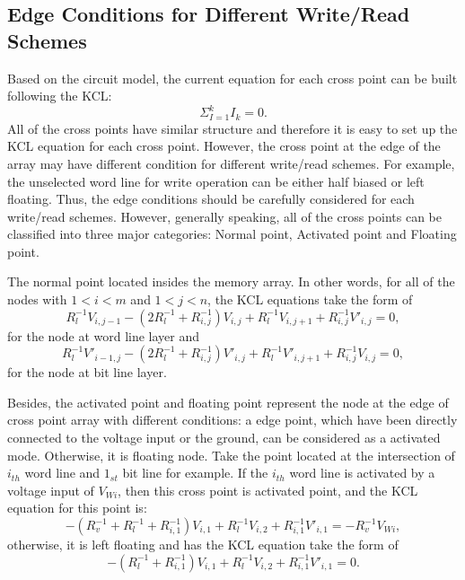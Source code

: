 \subsection{Edge Conditions for Different Write/Read Schemes}
Based on the circuit model, the current equation for each cross point can be built following the KCL:
\begin{equation}
  {\Sigma}_{I=1}^kI_k=0.
\end{equation}
All of the cross points have similar structure and therefore it is easy to set up the KCL equation for each cross point. However, the cross point at the edge of the array may have different condition for different write/read schemes. For example, the unselected word line for write operation can be either half biased or left floating. Thus, the edge conditions should be carefully considered for each write/read schemes. However, generally speaking, all of the cross points can be classified into three major categories: Normal point, Activated point and Floating point.

The normal point located insides the memory array. In other words, for all of the nodes with $1<i<m$ and $1<j<n$, the KCL equations take the form of
\begin{equation}\label{equ:KCL1}
R_l^{-1}V_{i,j-1} -(2R_l^{-1}+R_{i,j}^{-1})V_{i,j}+ R_l^{-1}V_{i,j+1}+R_{i,j}^{-1}V'_{i,j}=0,
\end{equation}
for the node at word line layer and
\begin{equation}\label{equ:KCL2}
R_l^{-1}V'_{i-1,j} -(2R_l^{-1}+R_{i,j}^{-1})V'_{i,j}+ R_l^{-1}V'_{i,j+1}+R_{i,j}^{-1}V_{i,j}=0,
\end{equation}
for the node at bit line layer.

Besides, the activated point and floating point represent the node at the edge of cross point array with different conditions: a edge point, which have been directly connected to the voltage input or the ground, can be considered as a activated mode. Otherwise, it is floating node. Take the point located at the intersection of $i_{th}$ word line and $1_{st}$ bit line for example. If the $i_{th}$ word line is activated by a voltage input of $V_{Wi}$, then this cross point is activated point, and the KCL equation for this point is:
\begin{equation}\label{equ:KCL3}
-(R_v^{-1}+R_l^{-1}+R_{i,1}^{-1})V_{i,1}+ R_l^{-1}V_{i,2}+R_{i,1}^{-1}V'_{i,1}=-R_v^{-1}V_{Wi},
\end{equation}
otherwise, it is left floating and has the KCL equation take the form of
\begin{equation}\label{equ:KCL4}
-(R_l^{-1}+R_{i,1}^{-1})V_{i,1}+ R_l^{-1}V_{i,2}+R_{i,1}^{-1}V'_{i,1}=0.
\end{equation}

